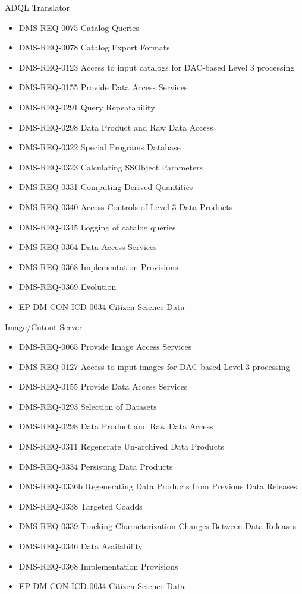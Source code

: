 ADQL Translator \begin{itemize}
\item DMS-REQ-0075 Catalog Queries
\item DMS-REQ-0078 Catalog Export Formats
\item DMS-REQ-0123 Access to input catalogs for DAC-based Level 3 processing
\item DMS-REQ-0155 Provide Data Access Services
\item DMS-REQ-0291 Query Repeatability
\item DMS-REQ-0298 Data Product and Raw Data Access
\item DMS-REQ-0322 Special Programs Database
\item DMS-REQ-0323 Calculating SSObject Parameters
\item DMS-REQ-0331 Computing Derived Quantities
\item DMS-REQ-0340 Access Controls of Level 3 Data Products
\item DMS-REQ-0345 Logging of catalog queries
\item DMS-REQ-0364 Data Access Services
\item DMS-REQ-0368 Implementation Provisions
\item DMS-REQ-0369 Evolution
\item EP-DM-CON-ICD-0034 Citizen Science Data
\end{itemize}
Image/Cutout Server \begin{itemize}
\item DMS-REQ-0065 Provide Image Access Services
\item DMS-REQ-0127 Access to input images for DAC-based Level 3 processing
\item DMS-REQ-0155 Provide Data Access Services
\item DMS-REQ-0293 Selection of Datasets
\item DMS-REQ-0298 Data Product and Raw Data Access
\item DMS-REQ-0311 Regenerate Un-archived Data Products
\item DMS-REQ-0334 Persisting Data Products
\item DMS-REQ-0336b Regenerating Data Products from Previous Data Releases
\item DMS-REQ-0338 Targeted Coadds
\item DMS-REQ-0339 Tracking Characterization Changes Between Data Releases
\item DMS-REQ-0346 Data Availability
\item DMS-REQ-0368 Implementation Provisions
\item EP-DM-CON-ICD-0034 Citizen Science Data
\end{itemize}
